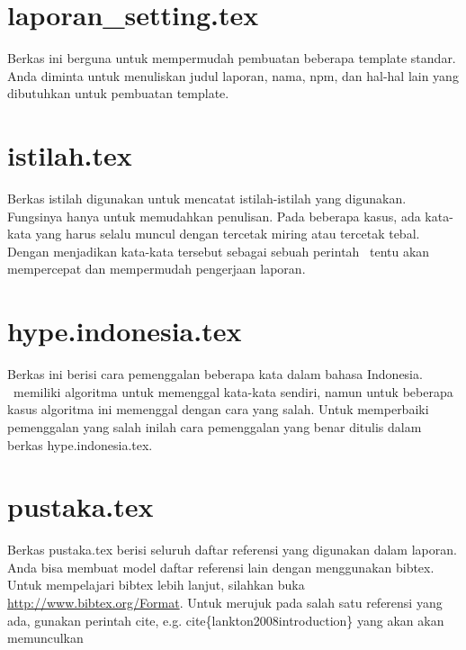 \section{laporan\_setting.tex}
Berkas ini berguna untuk mempermudah pembuatan beberapa template standar. 
Anda diminta untuk menuliskan judul laporan, nama, npm, dan hal-hal lain yang 
dibutuhkan untuk pembuatan template. 


\section{istilah.tex}
Berkas istilah digunakan untuk mencatat istilah-istilah yang digunakan. 
Fungsinya hanya untuk memudahkan penulisan.
Pada beberapa kasus, ada kata-kata yang harus selalu muncul dengan tercetak 
miring atau tercetak tebal. 
Dengan menjadikan kata-kata tersebut sebagai sebuah perintah \latex~tentu akan 
mempercepat dan mempermudah pengerjaan laporan. 


\section{hype.indonesia.tex}
Berkas ini berisi cara pemenggalan beberapa kata dalam bahasa Indonesia. 
\latex~memiliki algoritma untuk memenggal kata-kata sendiri, namun untuk 
beberapa kasus algoritma ini memenggal dengan cara yang salah. 
Untuk memperbaiki pemenggalan yang salah inilah cara pemenggalan yang benar 
ditulis dalam berkas hype.indonesia.tex.


\section{pustaka.tex}
Berkas pustaka.tex berisi seluruh daftar referensi yang digunakan dalam 
laporan. 
Anda bisa membuat model daftar referensi lain dengan menggunakan bibtex.
Untuk mempelajari bibtex lebih lanjut, silahkan buka 
\url{http://www.bibtex.org/Format}. 
Untuk merujuk pada salah satu referensi yang ada, gunakan perintah \bslash 
cite, e.g. \bslash cite\{lankton2008introduction\} yang akan akan memunculkan 
\cite{lankton2008introduction}


